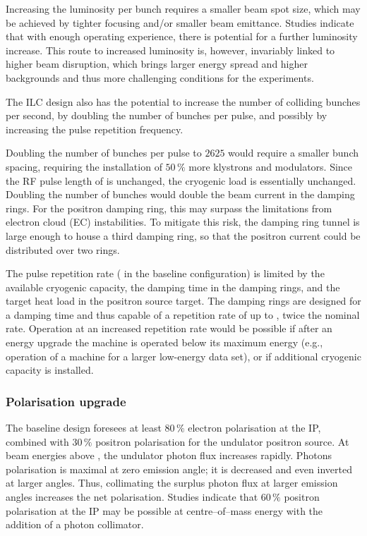 Increasing the luminosity per bunch requires a smaller beam spot size, which may be achieved by tighter focusing and/or smaller beam emittance.
Studies indicate that with enough operating experience, there is potential for a further luminosity increase. 
This route to increased luminosity is, however, invariably linked to higher beam disruption, which brings larger energy spread and higher backgrounds and thus more challenging conditions for the experiments.

The ILC design also has the potential to increase the number of colliding bunches per second, by doubling the number of bunches per pulse, and possibly by increasing the pulse repetition frequency.

Doubling the number of bunches per pulse to $2625$ would require a smaller bunch spacing, requiring  the installation of $50\,\%$ more klystrons and modulators. 
Since  the RF pulse length of  is unchanged, the cryogenic load is essentially unchanged.
Doubling the number of bunches would double the beam current in the damping rings.
For the positron damping ring, this may surpass the limitations from electron cloud (EC) instabilities. 
To mitigate this risk, the damping ring tunnel is large enough to house a third damping ring, so that the positron current could be distributed over two rings.

The pulse repetition rate ( in the baseline configuration) is limited by the available cryogenic capacity, the damping time in the damping rings, and the target heat load in the positron source target.
The damping rings are designed for a  damping time and thus capable of a repetition rate of up to , twice the nominal rate.
Operation at an increased repetition rate would be possible if after an energy upgrade the machine is operated below its maximum energy (e.g.,  operation of a  machine for a larger low-energy data set), or if additional cryogenic capacity is installed.

\subsubsection{Polarisation upgrade}
\label{subsubsec:upg-optP}

The baseline design foresees at least $80\,\%$ electron polarisation at the IP, combined with $30\,\%$ positron polarisation for the undulator positron source.
At beam energies above , the undulator photon flux increases rapidly. 
Photons polarisation is maximal at zero emission angle; it is decreased and even inverted at larger angles.
Thus, collimating the surplus photon flux at larger emission angles increases the net polarisation. 
Studies indicate that $60\,\%$ positron polarisation at the IP may be possible at  centre--of--mass energy with the addition of a photon collimator.
 


